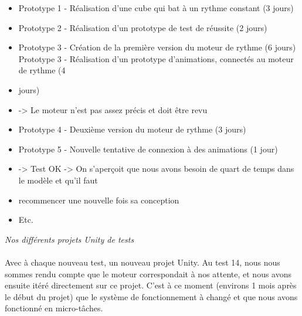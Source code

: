 \begin{itemize}
\item Prototype 1 - Réalisation d’une cube qui bat à un rythme constant (3 jours)
\item Prototype 2 - Réalisation d’un prototype de test de réussite (2 jours)
\item Prototype 3 - Création de la première version du moteur de rythme (6 jours)
Prototype 3 - Réalisation d’un prototype d’animations, connectés au moteur de rythme (4 \item jours)
\item -> Le moteur n’est pas assez précis et doit être revu
\item Prototype 4 - Deuxième version du moteur de rythme (3 jours)
\item Prototype 5 - Nouvelle tentative de connexion à des animations (1 jour)
\item -> Test OK
-> On s’aperçoit que nous avons besoin de quart de temps dans le modèle et qu’il faut \item recommencer une nouvelle fois sa conception
\item Etc.
\end{itemize}

\noindent
{}
\begin{center}
\textit{Nos différents projets Unity de tests
}
\end{center}

\paragraph{}
Avec à chaque nouveau test, un nouveau projet Unity. Au test 14, nous nous sommes rendu compte que le moteur correspondait à nos attente, et nous avons ensuite itéré directement sur ce projet. C’est à ce moment (environs 1 mois après le début du projet) que le système de fonctionnement à changé et que nous avons fonctionné en micro-tâches.

